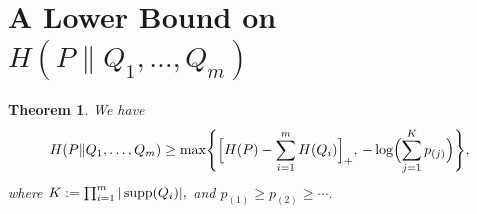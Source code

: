 \documentclass[journal]{IEEEtran}
\newtheorem{theorem}{Theorem}
\def\supp{\mathop{\rm supp}}
\newcommand{\1}{\mathbf{1}}
\begin{document}



\section{A Lower Bound on $H(P\|Q_1,\dots,Q_m)$}

\begin{theorem}\label{thm:converse-lb}
We have 
\[
H(P\|Q_1,\dots,Q_m)
\ge
\max\Biggl\{
\Bigl[H(P)-\sum_{i=1}^m H(Q_i)\Bigr]_+,\,
-\log \Bigl(\sum_{j=1}^{K} p_{(j)}\Bigr)
\Biggr\},
\]
where \(K:=\prod_{i=1}^m |\supp(Q_i)|,\) and $p_{(1)}\ge p_{(2)}\ge \cdots$. 
\end{theorem}
\end{document}
